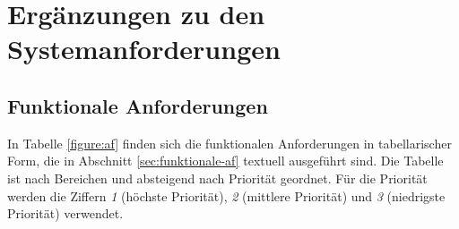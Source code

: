 \section{Ergänzungen zu den Systemanforderungen}

\subsection{Funktionale Anforderungen}
\label{subsec:af-tabelle}

In Tabelle \ref{figure:af} finden sich die funktionalen Anforderungen in tabellarischer Form, die in Abschnitt \ref{sec:funktionale-af} textuell ausgeführt sind. Die Tabelle ist nach Bereichen und absteigend nach Priorität geordnet. Für die Priorität werden die Ziffern \textit{1} (höchste Priorität), \textit{2} (mittlere Priorität) und \textit{3} (niedrigste Priorität) verwendet.  

\clearpage
\setlength{\hoffset}{-7mm}


